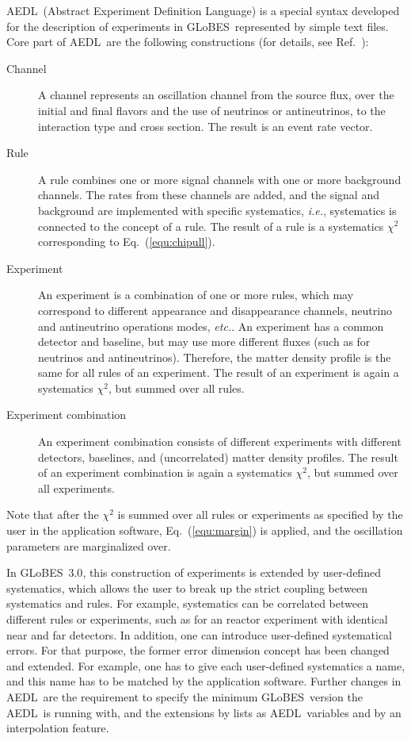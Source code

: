 \documentclass[12pt,a4paper]{article}
\newcommand{\ie}{{\it i.e.}}
\newcommand{\etc}{{\it etc.}}
\newcommand{\eq}{Eq.}
\newcommand{\Ref}{Ref.}
\newcommand{\GLOBES}{{\sf GLoBES}}
\newcommand{\GLOBESN}{{\sf GLoBES~3.0}}
\newcommand{\AEDL}{{\sf AEDL}}
\newcommand{\equ}[1]{\eq~(\ref{equ:#1})}
\begin{document}
\AEDL\ (Abstract Experiment Definition Language) is a special syntax developed for the description of
experiments in \GLOBES\ represented by simple text files. Core part of \AEDL\ are the following constructions
(for details, see \Ref~\cite{Manual}):
\begin{description}
\item[Channel] A channel represents an oscillation channel from the source flux, over the initial and final
flavors and the use of neutrinos or antineutrinos, to the interaction type and cross section. The result
is an event rate vector.
\item[Rule] A rule combines one or more signal channels with one or more background channels. The rates
from these channels are added, and the signal and background are implemented with specific systematics, \ie,
systematics is connected to the concept of a rule.
The result of a rule is a systematics $\chi^2$ corresponding to \equ{chipull}.
\item[Experiment] An experiment is a combination of one or more rules, which may correspond to different
appearance and disappearance channels, neutrino and antineutrino operations modes, \etc. An experiment has a common detector and baseline, but may use more different fluxes (such as for neutrinos and antineutrinos). Therefore,
the matter density profile is the same for all rules of an experiment. The result of an experiment
is again a systematics $\chi^2$, but summed over all rules.
\item[Experiment combination] An experiment combination consists of different experiments with different detectors, baselines, and (uncorrelated) matter density profiles. The result of an experiment combination
is again a systematics $\chi^2$, but summed over all experiments.
\end{description}
Note that after the $\chi^2$ is summed over all rules or experiments as specified by the user in the application software, \equ{margin} is applied, and the oscillation parameters are marginalized over. 

In \GLOBESN , this construction of experiments is extended by user-defined systematics, which allows
the user to break up the strict coupling between systematics and rules. For example, systematics can be
correlated between different rules or experiments, such as for an reactor experiment with identical
near and far detectors. In addition, one can introduce user-defined systematical errors.
For that purpose, the former error dimension concept has been changed and
extended. For example, one has to give each user-defined systematics a name, and this name has
to be matched by the application software. 
%
Further changes in \AEDL\ are the requirement to specify the minimum \GLOBES\ version the \AEDL\ is running with,
and the extensions by lists as \AEDL\ variables and by an interpolation feature.
\end{document}
